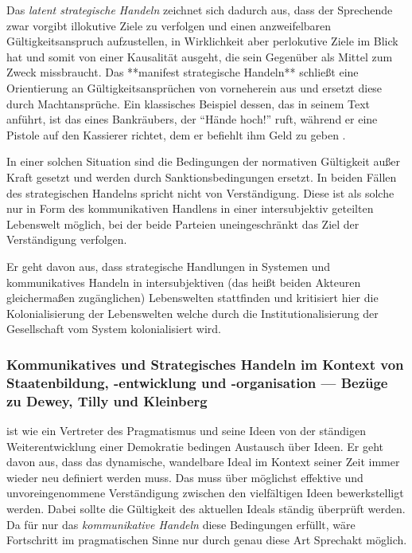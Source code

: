 Das \emph{latent strategische Handeln} zeichnet sich dadurch aus, dass der Sprechende zwar vorgibt illokutive Ziele zu verfolgen und einen anzweifelbaren Gültigkeitsanspruch aufzustellen, in Wirklichkeit aber perlokutive Ziele im Blick hat und somit von einer Kausalität ausgeht, die sein Gegenüber als Mittel zum Zweck missbraucht.
Das **manifest strategische Handeln** schließt eine Orientierung an Gültigkeitsansprüchen von vorneherein aus und ersetzt diese durch Machtansprüche. Ein klassisches Beispiel dessen, das \citeauthor{Habermas-1998-aa} in seinem Text anführt, ist das eines Bankräubers, der ``Hände hoch!'' ruft, während er eine Pistole auf den Kassierer richtet, dem er befiehlt ihm Geld zu geben \parencite[vgl.][225]{Habermas-1998-aa}.

In einer solchen Situation sind die Bedingungen der normativen Gültigkeit außer Kraft gesetzt und werden durch Sanktionsbedingungen ersetzt.
In beiden Fällen des strategischen Handelns spricht \citeauthor{Habermas-1998-aa} nicht von Verständigung.
Diese ist als solche nur in Form des kommunikativen Handlens in einer intersubjektiv geteilten Lebenswelt möglich, bei der beide Parteien uneingeschränkt das Ziel der Verständigung verfolgen.

Er geht davon aus, dass strategische Handlungen in Systemen und kommunikatives Handeln in intersubjektiven (das heißt beiden Akteuren gleichermaßen zugänglichen) Lebenswelten stattfinden und kritisiert hier die Kolonialisierung der Lebenswelten welche durch die Institutionalisierung der Gesellschaft vom System kolonialisiert wird.


\subsubsection{Kommunikatives und Strategisches Handeln im Kontext von Staatenbildung, -entwicklung und -organisation --- Bezüge zu Dewey, Tilly und Kleinberg}

\citeauthor{Dewey2010} ist wie \citeauthor{Habermas-1998-aa} ein Vertreter des Pragmatismus und seine Ideen von der ständigen Weiterentwicklung einer Demokratie bedingen Austausch über Ideen.
Er geht davon aus, dass das dynamische, wandelbare Ideal im Kontext seiner Zeit immer wieder neu definiert werden muss.
Das muss über möglichst effektive und unvoreingenommene Verständigung zwischen den vielfältigen Ideen bewerkstelligt werden.
Dabei sollte die Gültigkeit des aktuellen Ideals ständig überprüft werden.
Da für \citeauthor{Habermas-1998-aa} nur das \emph{kommunikative Handeln} diese Bedingungen erfüllt, wäre Fortschritt im pragmatischen Sinne nur durch genau diese Art Sprechakt möglich.

